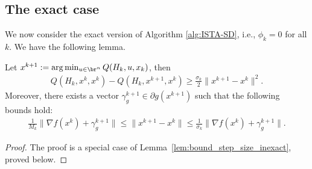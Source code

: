 \documentclass[11pt]{article}
\numberwithin{equation}{section}
\begin{document}
\subsection{The exact case}
We now consider the exact version of Algorithm \ref{alg:ISTA-SD}, i.e., $\phi_k=0$ for all $k$. 
We have the following lemma. 
\begin{lemma}\label{lem:bound_step_size}
Let $x^{k+1}:=\arg\min_{u\in\br^n} Q(H_k, u,x_k)$, then 
\begin{align}
	\label{equ:bound_Qk_Qk1}
    Q(H_k,x^k,x^k) - Q(H_k,x^{k+1}, x^k) \geq \frac{\sigma_k}{2}\|x^{k+1}-x^k\|^2.
\end{align}
Moreover, there exists a vector $\gamma_g^{k+1} \in \partial g(x^{k+1})$ such that the following bounds hold: 
\begin{align}
    \label{equ:bound_step_size}
    \frac{1}{M_k}\|  \nabla f(x^k) + \gamma_{g}^{k+1} \|
    \leq 
    \|x^{k+1} - x^k\| 
    \leq 
    \frac{1}{\sigma_k}\|  \nabla f(x^k) + \gamma_{g}^{k+1} \|.
\end{align}
\end{lemma}
\begin{proof}
     The proof is a special case of Lemma~\ref{lem:bound_step_size_inexact}, proved below.
\end{proof}
\end{document}
